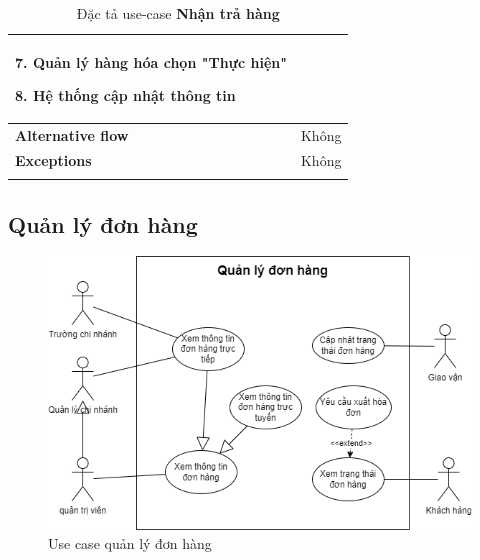 \begin{longtable}{| p{} | p{} |}
                    7. Quản lý hàng hóa chọn "Thực hiện"
                    
                    8. Hệ thống cập nhật thông tin
                \\
                \hline
                    \textbf{Alternative flow}
                &
                    Không
                \\
                \hline
                    \textbf{Exceptions} 
                &
                    Không
                \\
                \hline
                \caption{Đặc tả use-case \textbf{Nhận trả hàng}}
            \end{longtable}

\newpage

    \subsection{Quản lý đơn hàng}
        \begin{figure}[!htp]
            \centering
            \includegraphics[width=5in]{img/UseCase/UseCase-Quản lý đơn hàng.drawio.png}
            \newline
            \caption{Use case quản lý đơn hàng}
        \end{figure}
    
